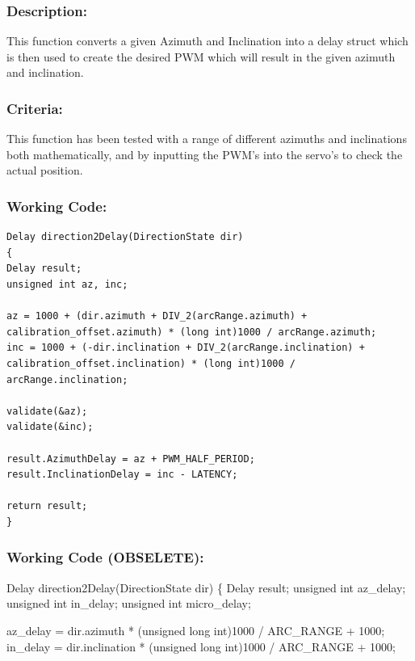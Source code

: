 \documentclass[]{report}
\begin{document}
\subsubsection{Description:}
This function converts a given Azimuth and Inclination into a delay struct which is then used to create the desired PWM which will result in the given azimuth and inclination.

\subsubsection{Criteria:}
This function has been tested with a range of different azimuths and inclinations both mathematically, and by inputting the PWM's into the servo's to check the actual position.

\subsubsection{Working Code:}
\begin{lstlisting}
Delay direction2Delay(DirectionState dir)
{
Delay result;
unsigned int az, inc;

az = 1000 + (dir.azimuth + DIV_2(arcRange.azimuth) + calibration_offset.azimuth) * (long int)1000 / arcRange.azimuth;
inc = 1000 + (-dir.inclination + DIV_2(arcRange.inclination) + calibration_offset.inclination) * (long int)1000 / arcRange.inclination;

validate(&az);
validate(&inc);

result.AzimuthDelay = az + PWM_HALF_PERIOD;
result.InclinationDelay = inc - LATENCY;

return result;
}
\end{lstlisting}

\subsubsection{Working Code (OBSELETE):}
Delay direction2Delay(DirectionState dir) \newline
\{\newline
	Delay result;\newline
	unsigned int az\_delay;\newline
	unsigned int in\_delay;\newline
	unsigned int micro\_delay;\newline
	
	az\_delay = dir.azimuth * (unsigned long int)1000 / ARC\_RANGE + 1000;\newline
	in\_delay = dir.inclination * (unsigned long int)1000 / ARC\_RANGE + 1000;\newline
	
\end{document}
